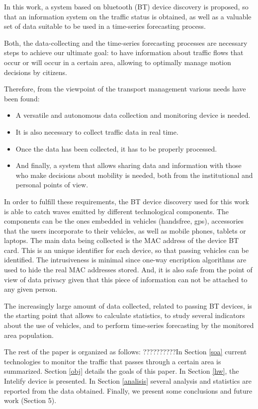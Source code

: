 \documentclass[preprint,authoryear,12pt]{elsarticle}
\begin{document}
In this work, a system based on bluetooth (BT) device discovery is proposed, so that an information system on the traffic status is obtained, as well as a valuable set of data suitable to be used in a time-series forecasting process.

Both, the data-collecting and the time-series forecasting processes are necessary steps to achieve our ultimate goal: to have information about traffic flows that occur or will occur in a certain area, allowing to optimally manage motion decisions by citizens.

Therefore, from the viewpoint of the transport management various needs have been found:

\begin{itemize}
  \item A versatile and autonomous data collection and monitoring device is needed.
  \item It is also necessary to collect traffic data in real time.
  \item Once the data has been collected, it has to be properly processed.
  \item And finally, a system that allows sharing data and information with those who make decisions about mobility is needed, both from the institutional and personal points of view.
\end{itemize}

In order to fulfill these requirements, the BT device discovery used for this work is able to catch waves emitted by different technological components. The components can be the ones embedded in vehicles (handsfree, gps), accessories that the users incorporate to their vehicles, as well as mobile phones, tablets or laptops.
The main data being collected is the MAC address of the device BT card.
This is an unique identifier for each device, so that passing vehicles can be identified.
The intrusiveness is minimal since one-way encription algorithms are used to hide the real MAC addresses stored. And, it is also safe from the point of view of data privacy given that this piece of information can not be attached to any given person.

The increasingly large amount of data collected, related to passing BT devices, is the starting point that allows to calculate statistics, to study several indicators about the use of vehicles, and to perform time-series forecasting by the monitored area population.

The rest of the paper is organized as follows:
??????????In Section \ref{soa} current technologies to monitor the traffic that passes through a certain area is summarized.
Section \ref{obj} details the goals of this paper.
In Section \ref{hw}, the Intelify device is presented.
In Section \ref{analisis} several analysis and statistics are reported from the data obtained.
Finally, we present some conclusions and future work (Section 5).
\end{document}
